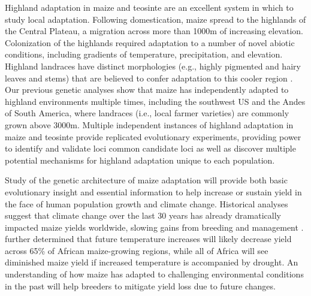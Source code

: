 Highland adaptation in maize and teosinte are an excellent system in which to study local adaptation.  Following domestication, maize spread to the highlands of the Central Plateau, a migration across more than 1000m of increasing elevation.  Colonization of the highlands required adaptation to a number of novel abiotic conditions, including gradients of temperature, precipitation, and elevation. Highland landraces have distinct morphologies (e.g., highly pigmented and hairy leaves and stems) that are believed to confer adaptation to this cooler region \citep{Doebley1984a}.  Our previous genetic analyses \citep{vanheerwaarden2011a} show that maize has independently adapted to highland environments multiple times, including the southwest US and the Andes of South America, where landraces (i.e., local farmer varieties) are commonly grown above 3000m. Multiple independent instances of highland adaptation in maize and teosinte provide replicated evolutionary experiments, providing power to identify and validate loci common candidate loci as well as discover multiple potential mechanisms for highland adaptation unique to each population.

Study of the genetic architecture of maize adaptation will provide both basic evolutionary insight and essential information to help increase or sustain yield in the face of human population growth and climate change. Historical analyses suggest that climate change over the last 30 years has already dramatically impacted maize yields worldwide, slowing gains from breeding and management \citep{Lobell2011}.  \citet{Lobell2011b} further determined that future temperature increases will likely decrease yield across 65\% of African maize-growing regions, while all of Africa  will see diminished maize yield if increased temperature is accompanied by drought.  An understanding of how maize has adapted to challenging environmental conditions in the past will help breeders to mitigate yield loss due to future changes.



